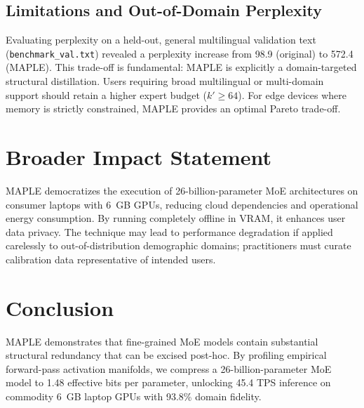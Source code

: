 \documentclass[10pt]{article}
\newcommand{\MAPLE}{\textsc{MAPLE}}
\begin{document}
\subsection{Limitations and Out-of-Domain Perplexity}
Evaluating perplexity on a held-out, general multilingual validation text (\texttt{benchmark\_val.txt}) revealed a perplexity increase from 98.9 (original) to 572.4 (\MAPLE{}). This trade-off is fundamental: \MAPLE{} is explicitly a domain-targeted structural distillation. Users requiring broad multilingual or multi-domain support should retain a higher expert budget ($k' \ge 64$). For edge devices where memory is strictly constrained, \MAPLE{} provides an optimal Pareto trade-off.

\section{Broader Impact Statement}
\MAPLE{} democratizes the execution of 26-billion-parameter MoE architectures on consumer laptops with 6~GB GPUs, reducing cloud dependencies and operational energy consumption. By running completely offline in VRAM, it enhances user data privacy. The technique may lead to performance degradation if applied carelessly to out-of-distribution demographic domains; practitioners must curate calibration data representative of intended users.

\section{Conclusion}
\MAPLE{} demonstrates that fine-grained MoE models contain substantial structural redundancy that can be excised post-hoc. By profiling empirical forward-pass activation manifolds, we compress a 26-billion-parameter MoE model to 1.48 effective bits per parameter, unlocking 45.4 TPS inference on commodity 6~GB laptop GPUs with 93.8\% domain fidelity.
\end{document}
